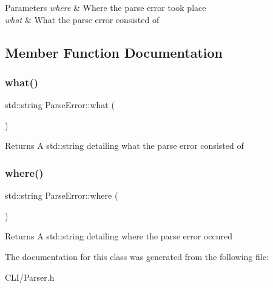 \begin{DoxyParams}{Parameters}
{\em where} & Where the parse error took place\\
\hline
{\em what} & What the parse error consisted of \\
\hline
\end{DoxyParams}


\subsection{Member Function Documentation}
\mbox{\label{classParseError_a08560dce27779ffee6c4bfb0d796aa6e}} 
\subsubsection{\texorpdfstring{what()}{what()}}
{\footnotesize\ttfamily std\+::string Parse\+Error\+::what (\begin{DoxyParamCaption}{ }\end{DoxyParamCaption})\hspace{0.3cm}{\ttfamily [inline]}}

\begin{DoxyReturn}{Returns}
A std\+::string detailing what the parse error consisted of 
\end{DoxyReturn}
\mbox{\label{classParseError_aa725d47c84792c9142267e51c2074f58}} 
\subsubsection{\texorpdfstring{where()}{where()}}
{\footnotesize\ttfamily std\+::string Parse\+Error\+::where (\begin{DoxyParamCaption}{ }\end{DoxyParamCaption})\hspace{0.3cm}{\ttfamily [inline]}}

\begin{DoxyReturn}{Returns}
A std\+::string detailing where the parse error occured 
\end{DoxyReturn}


The documentation for this class was generated from the following file\+:\begin{DoxyCompactItemize}
\item 
C\+L\+I/Parser.\+h\end{DoxyCompactItemize}
